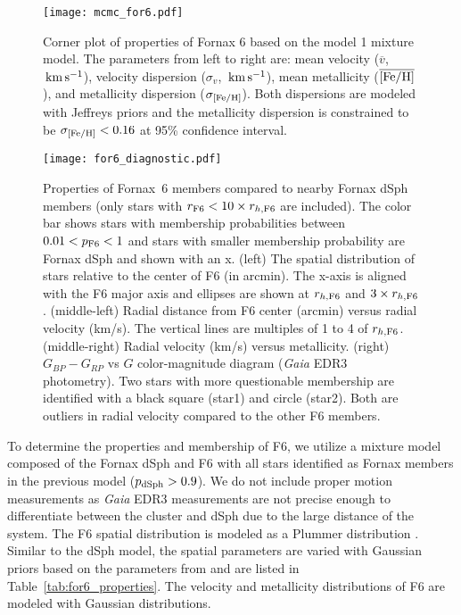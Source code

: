 \documentclass[twocolumn]{aastex63}
\begin{document}
\begin{figure}
\texttt{[image: mcmc\_for6.pdf]}
\caption{Corner plot of properties of Fornax 6 based on the model 1 mixture model.  The parameters from left to right are:  mean velocity ($\overline{v}$, $\mathrm{\,km} \mathrm{\,s}^{-1}$),  velocity dispersion ($\sigma_{v}$, $\mathrm{\,km} \mathrm{\,s}^{-1}$), mean metallicity ($\overline{\rm [Fe/H]}$), and metallicity dispersion ($\sigma_{\rm [Fe/H]}$).
Both dispersions are modeled with Jeffreys priors and the metallicity dispersion is constrained to be $\sigma_{\rm [Fe/H]}<0.16$ at 95\% confidence interval.
}
\label{fig:for6_corner}
\end{figure}

\begin{figure*}
\texttt{[image: for6\_diagnostic.pdf]}
\caption{Properties of Fornax~6 members compared to nearby Fornax dSph members (only stars with $r_{\rm F6} < 10\times r_{h, {\rm F6}}$ are included). The color bar shows stars with membership probabilities between $0.01< p_{\rm F6} < 1$ and stars with smaller membership probability are Fornax dSph and shown with an x.
(left) The spatial distribution of stars relative to the center of F6 (in arcmin).  The x-axis is aligned with the F6 major axis and ellipses are shown at $r_{ h, {\rm F6}}$ and $3 \times r_{ h, {\rm F6}}$.
(middle-left) Radial distance from F6 center (arcmin)  versus radial velocity (km/s).  The vertical lines are multiples of 1 to 4 of  $r_{ h, {\rm F6}}$.
(middle-right) Radial velocity (km/s) versus metallicity.
(right) $G_{BP}-G_{RP}$ vs $G$ color-magnitude diagram ({\it Gaia} EDR3 photometry).
Two stars with more questionable membership are identified with a black square (star1) and circle (star2).  Both are outliers in radial velocity compared to the other F6 members.
}
\label{fig:for6_diagnostic}
\end{figure*}



To determine the properties and membership of F6, we utilize a  mixture model composed of the Fornax dSph and F6  with all stars identified as Fornax members in the previous model ($p_{\rm dSph}>0.9$). 
We do not include  proper motion measurements  as {\it Gaia} EDR3 measurements are not precise enough to differentiate between the cluster and dSph due to the large distance of the system.
The F6 spatial distribution is modeled as a Plummer distribution \citep{Plummer1911MNRAS..71..460P}. Similar to the dSph model, the spatial parameters are varied with Gaussian priors based on the parameters from \citet{Wang2019ApJ...875L..13W} and are listed in Table~\ref{tab:for6_properties}.
The velocity and metallicity distributions of F6 are modeled with Gaussian distributions.
\end{document}
